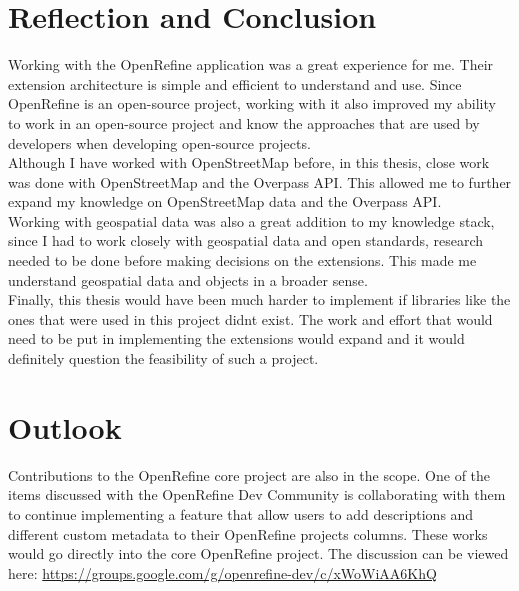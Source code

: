 \section{Reflection and Conclusion}
Working with the OpenRefine application was a great experience for me. Their extension architecture is simple and efficient to understand and use.
Since OpenRefine is an open-source project, working with it also improved my ability to work in an open-source project
and know the approaches that are used by developers when developing open-source projects.\\
\newline
Although I have worked with OpenStreetMap before, in this thesis, close work was done with OpenStreetMap and the Overpass API. This allowed me to further
expand my knowledge on OpenStreetMap data and the Overpass API.\\
\newline
Working with geospatial data was also a great addition to my knowledge stack, since I had to work closely with geospatial data and open standards,
research needed to be done before making decisions on the extensions. This made me understand geospatial data and objects in a broader sense.\\
\newline
Finally, this thesis would have been much harder to implement if libraries like the ones that were used in this project didn\textquotesingle t exist. The work and effort
that would need to be put in implementing the extensions would expand and it would definitely question the feasibility of such a project.
\section{Outlook}
Contributions to the OpenRefine core project are also in the scope. One of the items discussed with the OpenRefine Dev Community is collaborating with them to continue implementing a feature that allow users to add descriptions and different custom metadata to their OpenRefine project\textquotesingle s columns. These works would go directly into the core OpenRefine project. The discussion can be viewed here: \href{https://groups.google.com/g/openrefine-dev/c/xWoWiAA6KhQ}{https://groups.google.com/g/openrefine-dev/c/xWoWiAA6KhQ}
